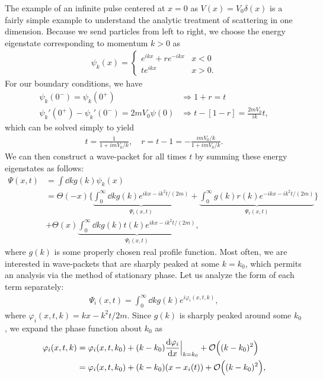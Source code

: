 The example of an infinite pulse centered at $x = 0$ as $V(x) = V_0 \delta(x)$ is a fairly simple example to understand the analytic treatment of scattering in one dimension.
Because we send particles from left to right, we choose the energy eigenstate corresponding to momentum $k > 0$ as
\begin{align}
    \psi_{k}(x) = 
    \begin{cases}
        e^{i k x} + r e^{-i k x} & x < 0 \\
        t e^{i k x} & x > 0
    .\end{cases}
\end{align}
For our boundary conditions, we have
\begin{align}
    \psi_{k}(0^{-}) = \psi_{k}(0^{+}) &\Rightarrow 1 + r = t \\
    \psi_{k}'(0^{+}) - \psi_{k}'(0^{-}) = 2 m V_0 \psi(0) &\Rightarrow t - [1 - r] = \frac{2 m V_0}{i k} t
,\end{align}
which can be solved simply to yield
\begin{align}
    t = \frac{1}{1 + i m V_0 / k}, \quad r = t - 1 = -\frac{i m V_0 / k}{1 + i m V_0 / k}
.\end{align}
We can then construct a wave-packet for all times $t$ by summing these energy eigenstates as follows:
\begin{align}
    \Psi(x,t) &= \int \dd{k} g(k) \psi_{k}(x) \nonumber \\
              &= \Theta(-x) \Bigg\{ \underbrace{ \int_{0}^{\infty} \dd{k} g(k) e^{i k x - i k^2 t / (2m)} }_{\Psi_{i}(x,t)} + \underbrace{ \int_{0}^{\infty} g(k) r(k) e^{-i k x - i k^2 t / (2m)} }_{\Psi_{r}(x,t)} \Bigg\} \nonumber \\
              &+ \Theta(x) \underbrace{ \int_{0}^{\infty} \dd{k} g(k) t(k) e^{i k x - i k^2 t / (2m)} }_{\Psi_{t}(x,t)}
,\end{align}
where $g(k)$ is some properly chosen real profile function.
Most often, we are interested in wave-packets that are sharply peaked at some $k = k_0$, which permits an analysis via the method of stationary phase.
Let us analyze the form of each term separately:
\begin{align}
    \Psi_{i}(x,t) = \int_{0}^{\infty} \dd{k} g(k) e^{i \varphi_{i}(x,t,k)}
,\end{align}
where $\varphi_{i}(x,t,k) = kx - k^2 t / 2m$.
Since $g(k)$ is sharply peaked around some $k_0$, we expand the phase function about $k_{0}$ as
\begin{align}
    \varphi_{i}(x,t,k) &= \varphi_{i}(x,t,k_0) + (k - k_0) \dv{\varphi_{i}}{x}\Big|_{k=k_0} + \mathcal{O}\Big( (k - k_0)^2 \Big) \nonumber \\
                       &= \varphi_{i}(x,t,k_0) + (k - k_0) (x - x_{i}(t)) + \mathcal{O}\Big( (k - k_0)^2 \Big)
,\end{align}

